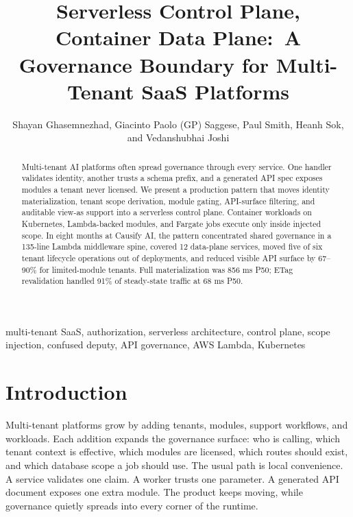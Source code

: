 \documentclass[10pt,journal]{IEEEtran}
\begin{document}
\title{Serverless Control Plane, Container Data Plane:\
A Governance Boundary for Multi-Tenant SaaS Platforms}

\author{Shayan Ghasemnezhad, Giacinto Paolo (GP) Saggese, Paul Smith, Heanh Sok, and Vedanshubhai Joshi}

\maketitle

\begin{abstract}
Multi-tenant AI platforms often spread governance through every service. One handler validates identity, another trusts a schema prefix, and a generated API spec exposes modules a tenant never licensed. We present a production pattern that moves identity materialization, tenant scope derivation, module gating, API-surface filtering, and auditable view-as support into a serverless control plane. Container workloads on Kubernetes, Lambda-backed modules, and Fargate jobs execute only inside injected scope. In eight months at Causify AI, the pattern concentrated shared governance in a 135-line Lambda middleware spine, covered 12 data-plane services, moved five of six tenant lifecycle operations out of deployments, and reduced visible API surface by 67--90\% for limited-module tenants. Full materialization was 856 ms P50; ETag revalidation handled 91\% of steady-state traffic at 68 ms P50.
\end{abstract}

\begin{IEEEkeywords}
multi-tenant SaaS, authorization, serverless architecture, control plane,
scope injection, confused deputy, API governance, AWS Lambda, Kubernetes
\end{IEEEkeywords}

\section{Introduction}

\lettrine[lines=2, lhang=0.1, loversize=0.05]{M}{}ulti-tenant platforms grow by adding tenants, modules, support workflows, and workloads. Each addition expands the governance surface: who is calling, which tenant context is effective, which modules are licensed, which routes should exist, and which database scope a job should use. The usual path is local convenience. A service validates one claim. A worker trusts one parameter. A generated API document exposes one extra module. The product keeps moving, while governance quietly spreads into every corner of the runtime.
\end{document}

